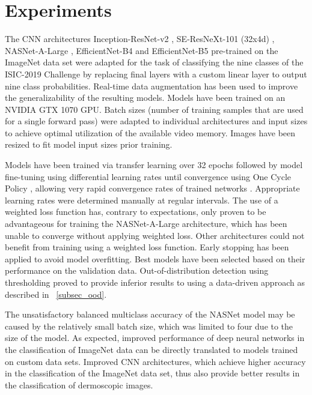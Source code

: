 \documentclass[journal]{IEEEtran}
\begin{document}
\section{Experiments}
The CNN architectures Inception-ResNet-v2 \cite{DBLP:journals/corr/SzegedyIV16}, SE-ResNeXt-101 (32x4d) \cite{hu2018squeeze}, NASNet-A-Large \cite{DBLP:journals/corr/abs-1712-00559}, EfficientNet-B4 and EfficientNet-B5 \cite{ DBLP:journals/corr/abs-1905-11946} pre-trained on the ImageNet data set were adapted for the task of classifying the nine classes of the ISIC-2019 Challenge by replacing final layers with a custom linear layer to output nine class probabilities. Real-time data augmentation has been used to improve the generalizability of the resulting models. Models have been trained on an NVIDIA GTX 1070 GPU. Batch sizes (number of training samples that are used for a single forward pass) were adapted to individual architectures and input sizes to achieve optimal utilization of the available video memory. Images have been resized to fit model input sizes prior training.

Models have been trained via transfer learning over 32 epochs followed by model fine-tuning using differential learning rates until convergence using One Cycle Policy \cite{smith2018disciplined}, allowing very rapid convergence rates of trained networks \cite{smith2019super}. Appropriate learning rates were determined manually at regular intervals. The use of a weighted loss function has, contrary to expectations, only proven to be advantageous for training the NASNet-A-Large architecture, which has been unable to converge without applying weighted loss. Other architectures could not benefit from training using a weighted loss function. Early stopping has been applied to avoid model overfitting. Best models have been selected based on their performance on the validation data. Out-of-distribution detection using  thresholding proved to provide inferior results to using a data-driven approach as described in ~\ref{subsec_ood}.

The unsatisfactory balanced multiclass accuracy of the NASNet model may be caused by the relatively small batch size, which was limited to four due to the size of the model. As expected, improved performance of deep neural networks in the classification of ImageNet data can be directly translated to models trained on custom data sets. Improved CNN architectures, which achieve higher accuracy in the classification of the ImageNet data set, thus also provide better results in the classification of dermoscopic images.
\end{document}
